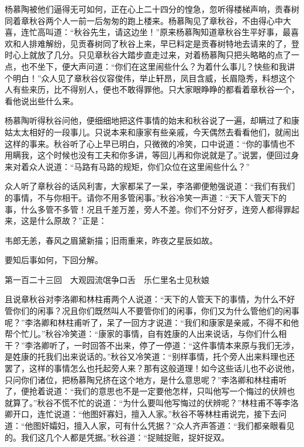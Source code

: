 \documentclass[12pt,UTF8]{ctexbook}
\begin{document}
{{{杨慕陶被他们逼得无可如何，正在心上二十四分的惶急，忽听得楼梯声响，贡春树同着章秋谷两个人一前一后匆匆的跑上楼来。杨慕陶见了章秋谷，不由得心中大喜，连忙高叫道：“秋谷先生，请这边坐！”原来杨慕陶知道章秋谷生平好事，最喜欢和人排难解纷，见贡春树同了秋谷上来，早已料定是贡春树特地去请来的了，登时心上就放了几分。只见章秋谷大踏步直走过来，对着杨慕陶只把头略略的点了一点，也不坐下，便大声问道：“你们在这里闹些什么？为着什么事儿？快些和我讲个明白！”众人见了章秋谷仪容俊伟，举止轩昂，凤目含威，长眉隐秀，料想这个人有些来历，比不得别人，便也不敢得罪他。只大家眼睁睁的都看着章秋谷一个，看他说出些什么来。

杨慕陶听得秋谷问他，便细细地把这件事情的始末和秋谷说了一遍，却瞒过了和康姑太太相好的一段事儿。只说本来和康家有些亲戚，今天偶然去看看他们，就闹出这样的事来。秋谷听了心上早已明白，只微微的冷笑，口中说道：“你的事情也不用瞒我，这个时候也没有工夫和你多讲，等回儿再和你说就是了。”说罢，便回过身来对着众人说道：“马路有马路的规矩，你们众位在这里闹些什么？”

众人听了章秋谷的话风利害，大家都呆了一呆，李洛卿便勉强说道：“我们有我们的事情，不与你相干。请你不用多管闲事。”秋谷冷笑一声道：“天下人管天下的事，什么多管不多管！况且千差万差，旁人不差。你们不分好歹，连旁人都得罪起来，这是什么原故？”正是：

韦郎无恙，春风之眉黛新描；旧雨重来，昨夜之星辰如故。

要知后事如何，下回分解。





第一百二十三回　大观园流氓争口舌　乐仁里名士见秋娘





且说章秋谷对李洛卿和林柱甫两个人说道：“天下的人管天下的事情，为什么不好管你们的闲事？况且你们既然叫人不要管你们的闲事，你们又为什么管他们的闲事呢？”李洛卿和林柱甫听了，呆了一回方才说道：“我们和康家是亲戚，不得不和他帮个忙儿。”秋谷冷笑道：“康家的事情，自有姓康的人出来说话，与你们什么相干？”李洛卿听了，一时回答不出来，停了一停道：“这件事情本来原与我们无涉，是姓康的托我们出来说话的。”秋谷又冷笑道：“别样事情，托个旁人出来料理也还罢了，这样的事情怎么也托起旁人来？那有这般道理！如今这些话儿也不必说他，只问你们诸位，把杨慕陶兄挤在这个地方，是什么意思呢？”李洛卿和林柱甫听了，便抢着说道：“我们的意思也不是一定要他怎样，只叫他写一个悔过的伏辨也就算了。”秋谷不慌不忙的说道：“为什么要叫他写悔过的伏辨呢？”林柱甫不等李洛卿开口，连忙说道：“他图奸寡妇，擅入人家。”秋谷不等林柱甫说完，接下去问道：“他图奸孀妇，擅入人家，可有什么凭据？”众人齐声答道：“我们都亲眼看见的。我们这几个人都是凭据。”秋谷道：“捉贼捉赃，捉奸捉双。

}}}
\end{document}
